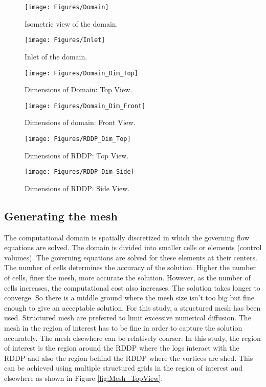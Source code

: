 \begin{figure}
\centering
\texttt{[image: Figures/Domain]}
\caption{\label{fig:Domain}Isometric view of the domain.}
\end{figure}

\begin{figure}
\centering
\texttt{[image: Figures/Inlet]}
\caption{\label{fig:Inlet}Inlet of the domain.}
\end{figure}

\begin{figure}
\centering
\texttt{[image: Figures/Domain\_Dim\_Top]}
\caption{\label{fig:Domain_Dim_Top}Dimensions of Domain: Top View.}
\end{figure}

\begin{figure}
\centering
\texttt{[image: Figures/Domain\_Dim\_Front]}
\caption{\label{fig:Domain_Dim_Front}Dimensions of domain: Front View.}
\end{figure}

\begin{figure}
\centering
\texttt{[image: Figures/RDDP\_Dim\_Top]}
\caption{\label{fig:RDDP_Dim_Top}Dimensions of RDDP: Top View.}
\end{figure}

\begin{figure}
\centering
\texttt{[image: Figures/RDDP\_Dim\_Side]}
\caption{\label{fig:RDDP_Dim_Side}Dimensions of RDDP: Side View.}
\end{figure}

\subsection*{Generating the mesh}
The computational domain is spatially discretized in which the governing flow equations are solved. The domain is divided into smaller cells or elements (control volumes). The governing equations are solved for these elements at their centers.\\
The number of cells determines the accuracy of the solution. Higher the number of cells, finer the mesh, more accurate the solution. However, as the number of cells increases, the computational cost also increases. The solution takes longer to converge. So there is a middle ground where the mesh size isn't too big but fine enough to give an acceptable solution. 
For this study, a structured mesh has been used. Structured mesh are preferred to limit excessive numerical diffusion. The mesh in the region of interest has to be fine in order to capture the solution accurately. The mesh elsewhere can be relatively coarser. In this study, the region of interest is the region around the RDDP where the logs interact with the RDDP and also the region behind the RDDP where the vortices are shed. This can be achieved using multiple structured grids in the region of interest and elsewhere as shown in Figure \ref{fig:Mesh_TopView}.\\

